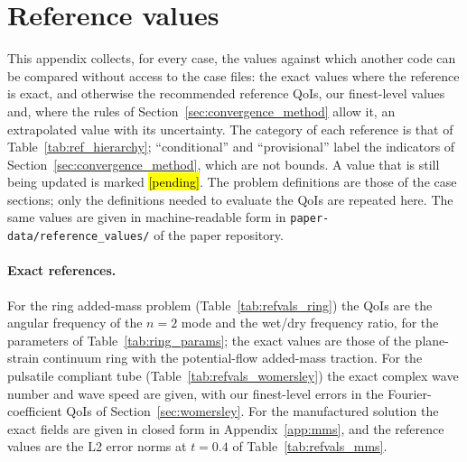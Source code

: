 \section{Reference values}
\label{app:reference_values}

This appendix collects, for every case, the values against which another code can be compared without access to the case files: the exact values where the reference is exact, and otherwise the recommended reference QoIs, our finest-level values and, where the rules of Section~\ref{sec:convergence_method} allow it, an extrapolated value with its uncertainty.
The category of each reference is that of Table~\ref{tab:ref_hierarchy}; ``conditional'' and ``provisional'' label the indicators of Section~\ref{sec:convergence_method}, which are not bounds.
A value that is still being updated is marked \hl{[pending]}.
The problem definitions are those of the case sections; only the definitions needed to evaluate the QoIs are repeated here.
The same values are given in machine-readable form in \texttt{paper-data/reference\_values/} of the paper repository.

\paragraph{Exact references.}
For the ring added-mass problem (Table~\ref{tab:refvals_ring}) the QoIs are the angular frequency of the $n=2$ mode and the wet/dry frequency ratio, for the parameters of Table~\ref{tab:ring_params}; the exact values are those of the plane-strain continuum ring with the potential-flow added-mass traction.
For the pulsatile compliant tube (Table~\ref{tab:refvals_womersley}) the exact complex wave number and wave speed are given, with our finest-level errors in the Fourier-coefficient QoIs of Section~\ref{sec:womersley}.
For the manufactured solution the exact fields are given in closed form in Appendix~\ref{app:mms}, and the reference values are the L2 error norms at $t = 0.4$ of Table~\ref{tab:refvals_mms}.

